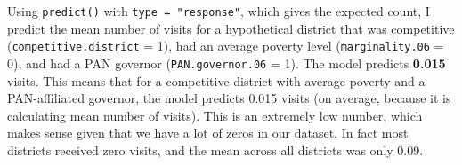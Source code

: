 \documentclass[12pt,letterpaper]{article}
\begin{document}
\noindent Using \texttt{predict()} with \texttt{type = "response"}, which gives 
the expected count, I predict the mean number of visits for a hypothetical district  that was competitive (\texttt{competitive.district} = 1), had an average poverty level (\texttt{marginality.06} = 0), and had a PAN governor 
(\texttt{PAN.governor.06} = 1). The model predicts \textbf{0.015} visits. This means that for a competitive district with average poverty and a PAN-affiliated 
governor, the model predicts 0.015 visits (on average, because it is calculating mean number of visits). This is an extremely low number, which makes sense given that we have a lot of zeros in our dataset. In fact most districts received zero visits, and the mean across all  districts was only 0.09.\newline
\end{document}
